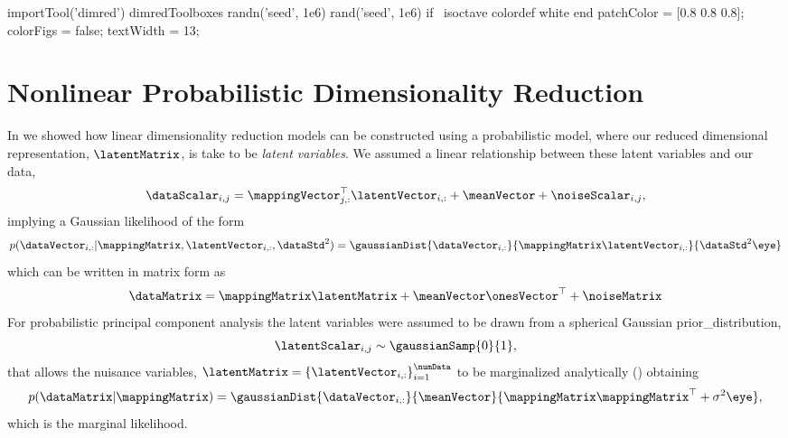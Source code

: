 \begin{octave}
  importTool('dimred')
  dimredToolboxes
  randn('seed', 1e6)
  rand('seed', 1e6)
  if ~isoctave
    colordef white
  end
  patchColor = [0.8 0.8 0.8];
  colorFigs = false;
  textWidth = 13;
\end{octave}

\chapter{Nonlinear Probabilistic Dimensionality Reduction}\label{chap:nonlinear}

In  we showed how linear dimensionality reduction models can be constructed using a probabilistic model, where our reduced dimensional representation, $\latentMatrix$, is take to be \emph{latent variables}. We assumed a linear relationship between these latent variables and our data,
\[
\dataScalar_{i, j} = \mappingVector_{j, :}^\top \latentVector_{i, :} + \meanVector + \noiseScalar_{i, j},
\]
implying a Gaussian likelihood of the form
\[
p(\dataVector_{i, :}| \mappingMatrix, \latentVector_{i, :}, \dataStd^2) = \gaussianDist{\dataVector_{i, :}}{\mappingMatrix\latentVector_{i, :}}{\dataStd^2\eye}
\]
which can be written in matrix form as
\[
\dataMatrix = \mappingMatrix\latentMatrix + \meanVector\onesVector^\top + \noiseMatrix
\]
For probabilistic principal component analysis the latent variables were assumed to be drawn from a spherical Gaussian \gls{prior_distribution},
\[
\latentScalar_{i, j} \sim \gaussianSamp{0}{1},
\]
that allows the nuisance variables, $\latentMatrix =
\left\{\latentVector_{i, :}\right\}_{i=1}^\numData$ to be marginalized analytically () obtaining
\[
p(\dataMatrix|\mappingMatrix) = \gaussianDist{\dataVector_{i, :}}{\meanVector}{\mappingMatrix\mappingMatrix^\top + \sigma^2\eye},
\]
which is the marginal likelihood.

